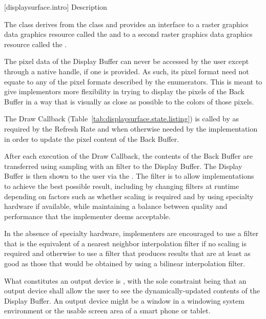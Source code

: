 [displaysurface.intro] { Description}

\pnum
{}
The class  derives from the  class and provides an interface to a raster graphics data graphics resource called the  and to a second raster graphics data graphics resource called the .

\pnum
The pixel data of the Display Buffer can never be accessed by the user except through a native handle, if one is provided. As such, its pixel format need not equate to any of the pixel formats described by the  enumerators. This is meant to give implementors more flexibility in trying to display the pixels of the Back Buffer in a way that is visually as close as possible to the colors of those pixels.

\pnum
The Draw Callback (Table~\ref{tab:displaysurface.state.listing}) is called by  as required by the Refresh Rate and when otherwise needed by the implementation in order to update the pixel content of the Back Buffer.

\pnum
After each execution of the Draw Callback, the contents of the Back Buffer are transferred using sampling with an \unspecnorm filter to the Display Buffer. The Display Buffer is then shown to the user via the .
\enternote
The filter is \unspecnorm to allow implementations to achieve the best possible result, including by changing filters at runtime depending on factors such as whether scaling is required and by using specialty hardware if available, while maintaining a balance between quality and performance that the implementer deems acceptable.

In the absence of specialty hardware, implementers are encouraged to use a filter that is the equivalent of a nearest neighbor interpolation filter if no scaling is required and otherwise to use a filter that produces results that are at least as good as those that would be obtained by using a bilinear interpolation filter.
\exitnote

\pnum
What constitutes an output device is , with the sole constraint being that an output device shall allow the user to see the dynamically-updated contents of the Display Buffer.
\enterexample
An output device might be a window in a windowing system environment or the usable screen area of a smart phone or tablet.
\exitexample

